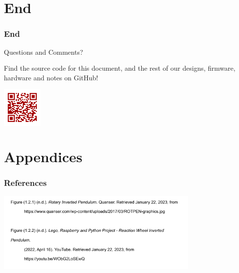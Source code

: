 \documentclass[aspectratio=169]{beamer}
\begin{document}
\section{End}
\begin{frame}
    \frametitle{End}

    \begin{block}{}
        \begin{center}
            \Huge Questions and Comments?
        \end{center}
    \end{block}

    \begin{center}
        Find the source code for this document, and the rest of our designs, firmware, hardware
        and notes on GitHub!

        \includegraphics[height=2cm]{github_qr}
    \end{center}


\end{frame}

\section{Appendices}
\begin{frame}
    \frametitle{References}

    \includegraphics[height=4cm]{references}
\end{frame}
\end{document}
